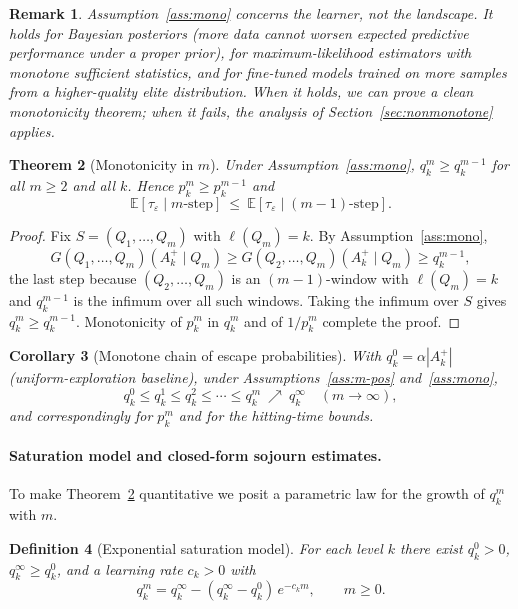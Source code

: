 \documentclass[11pt,a4paper]{article}
\newtheorem{theorem}{Theorem}[section]
\newtheorem{corollary}[theorem]{Corollary}
\newtheorem{definition}[theorem]{Definition}
\newtheorem{remark}[theorem]{Remark}
\newcommand{\E}{\mathbb{E}}
\newcommand{\Akp}{A_k^{+}}
\begin{document}
\begin{remark}
  Assumption~\ref{ass:mono} concerns the \emph{learner}, not the
  landscape.  It holds for Bayesian posteriors (more data cannot worsen
  expected predictive performance under a proper prior), for
  maximum-likelihood estimators with monotone sufficient statistics, and
  for fine-tuned models trained on more samples from a higher-quality
  elite distribution.  When it holds, we can prove a clean monotonicity
  theorem; when it fails, the analysis of Section~\ref{sec:nonmonotone}
  applies.
\end{remark}

\begin{theorem}[Monotonicity in $m$]\label{thm:mono}
  Under Assumption~\ref{ass:mono}, $q_k^m\ge q_k^{m-1}$ for all $m\ge2$
  and all $k$.  Hence $p_k^m\ge p_k^{m-1}$ and
  \[
    \E[\tau_\varepsilon\mid m\text{-step}]
    \ \le\
    \E[\tau_\varepsilon\mid(m-1)\text{-step}].
  \]
\end{theorem}

\begin{proof}
  Fix $S=(Q_1,\dots,Q_m)$ with $\ell(Q_m)=k$.  By
  Assumption~\ref{ass:mono},
  \[
    G(Q_1,\dots,Q_m)(\Akp\mid Q_m)
    \ge G(Q_2,\dots,Q_m)(\Akp\mid Q_m)
    \ge q_k^{m-1},
  \]
  the last step because $(Q_2,\dots,Q_m)$ is an $(m-1)$-window with
  $\ell(Q_m)=k$ and $q_k^{m-1}$ is the infimum over all such windows.
  Taking the infimum over $S$ gives $q_k^m\ge q_k^{m-1}$.  Monotonicity
  of $p_k^m$ in $q_k^m$ and of $1/p_k^m$ complete the proof.
\end{proof}

\begin{corollary}[Monotone chain of escape probabilities]\label{cor:chain}
  With $q_k^0=\alpha|\Akp|$ (uniform-exploration baseline), under
  Assumptions~\ref{ass:m-pos} and~\ref{ass:mono},
  \[
    q_k^0\le q_k^1\le q_k^2\le\cdots\le q_k^m\ \nearrow\ q_k^\infty
    \quad(m\to\infty),
  \]
  and correspondingly for $p_k^m$ and for the hitting-time bounds.
\end{corollary}

\paragraph{Saturation model and closed-form sojourn estimates.}

To make Theorem~\ref{thm:mono} quantitative we posit a parametric law
for the growth of $q_k^m$ with $m$.

\begin{definition}[Exponential saturation model]\label{def:sat}
  For each level $k$ there exist $q_k^0>0$, $q_k^\infty\ge q_k^0$, and a
  \emph{learning rate} $c_k>0$ with
  \begin{equation}
    q_k^m=q_k^\infty-(q_k^\infty-q_k^0)\,e^{-c_k m},\qquad m\ge0.
    \label{eq:sat}
  \end{equation}
\end{definition}
\end{document}
